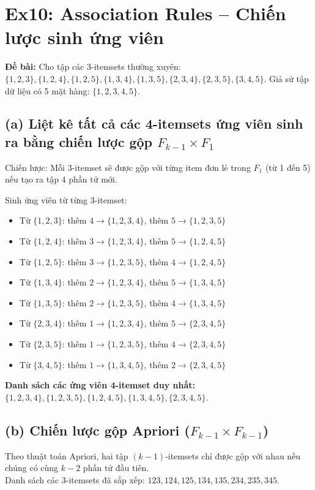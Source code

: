 \section{Ex10: Association Rules -- Chiến lược sinh ứng viên}

\textbf{Đề bài:} Cho tập các 3-itemsets thường xuyên: $\{1,2,3\}, \{1,2,4\}, \{1,2,5\}, \{1,3,4\}, \{1,3,5\}, \{2,3,4\}, \{2,3,5\}, \{3,4,5\}$. Giả sử tập dữ liệu có 5 mặt hàng: $\{1,2,3,4,5\}$.

\subsection*{(a) Liệt kê tất cả các 4-itemsets ứng viên sinh ra bằng chiến lược gộp $F_{k-1} \times F_1$}
Chiến lược: Mỗi 3-itemset sẽ được gộp với từng item đơn lẻ trong $F_1$ (từ 1 đến 5) nếu tạo ra tập 4 phần tử mới.

Sinh ứng viên từ từng 3-itemset:
\begin{itemize}
    \item Từ $\{1,2,3\}$: thêm $4 \rightarrow \{1,2,3,4\}$, thêm $5 \rightarrow \{1,2,3,5\}$
    \item Từ $\{1,2,4\}$: thêm $3 \rightarrow \{1,2,3,4\}$, thêm $5 \rightarrow \{1,2,4,5\}$
    \item Từ $\{1,2,5\}$: thêm $3 \rightarrow \{1,2,3,5\}$, thêm $4 \rightarrow \{1,2,4,5\}$
    \item Từ $\{1,3,4\}$: thêm $2 \rightarrow \{1,2,3,4\}$, thêm $5 \rightarrow \{1,3,4,5\}$
    \item Từ $\{1,3,5\}$: thêm $2 \rightarrow \{1,2,3,5\}$, thêm $4 \rightarrow \{1,3,4,5\}$
    \item Từ $\{2,3,4\}$: thêm $1 \rightarrow \{1,2,3,4\}$, thêm $5 \rightarrow \{2,3,4,5\}$
    \item Từ $\{2,3,5\}$: thêm $1 \rightarrow \{1,2,3,5\}$, thêm $4 \rightarrow \{2,3,4,5\}$
    \item Từ $\{3,4,5\}$: thêm $1 \rightarrow \{1,3,4,5\}$, thêm $2 \rightarrow \{2,3,4,5\}$
\end{itemize}
\textbf{Danh sách các ứng viên 4-itemset duy nhất:} $\{1,2,3,4\}, \{1,2,3,5\}, \{1,2,4,5\}, \{1,3,4,5\}, \{2,3,4,5\}$.

\subsection*{(b) Chiến lược gộp Apriori ($F_{k-1} \times F_{k-1}$)}
Theo thuật toán Apriori, hai tập $(k-1)$-itemsets chỉ được gộp với nhau nếu chúng có cùng $k-2$ phần tử đầu tiên. \\
Danh sách các 3-itemsets đã sắp xếp: $123, 124, 125, 134, 135, 234, 235, 345$.

